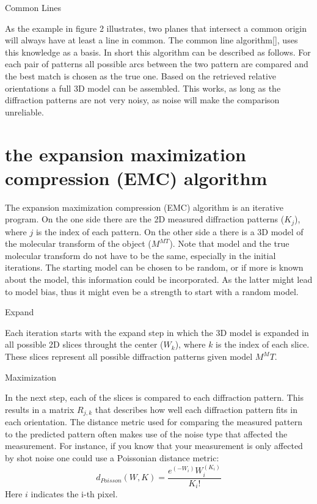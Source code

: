 Common Lines

As the example in figure 2 illustrates, two planes that intersect a common origin will always have at least a line in common. The common line algorithm[], uses this knowledge as a basis. In short this algorithm can be described as follows. For each pair of patterns all possible arcs between the two pattern are compared and the best match is chosen as the true one. Based on the retrieved relative orientations a full 3D model can be assembled. This works, as long as the diffraction patterns are not very noisy, as noise will make the comparison unreliable.

\section{the expansion maximization compression (EMC) algorithm}
The expansion maximization compression (EMC) algorithm is an iterative program. On the one side there are the 2D measured diffraction patterns ($K_j$), where $j$ is the index of each pattern. On the other side a there is a 3D model of the molecular transform of the object ($M^{MT}$). Note that model and the true molecular transform do not have to be the same, especially in the initial iterations. The starting model can be chosen to be random, or if more is known about the model, this information could be incorporated. As the latter might lead to model bias, thus it might even be a strength to start with a random model.

Expand 

Each iteration starts with the expand step in which the 3D model is expanded in all possible 2D slices throught the center ($W_k$), where $k$ is the index of each slice. These slices represent all possible diffraction patterns given model $M^MT$. 

Maximization 

In the next step, each of the slices is compared to each diffraction pattern. This results in a matrix $R_{j,k}$ that describes how well each diffraction pattern fits in each orientation. The distance metric used for comparing the measured pattern to the predicted pattern often makes use of the noise type that affected the measurement. For instance, if you know that your measurement is only affected by shot noise one could use a Poissonian distance metric:
\begin{equation}
d_{Poisson}(W,K) = \frac{e^(-W_i)W_i^(K_i)}{K_i !}
\end{equation}
Here $i$ indicates the i-th pixel.

